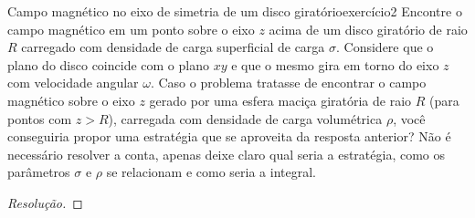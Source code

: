 \begin{exercício}{Campo magnético no eixo de simetria de um disco giratório}{exercício2}
    Encontre o campo magnético em um ponto sobre o eixo \(z\) acima de um disco giratório de raio \(R\) carregado com densidade de carga superficial de carga \(\sigma\). Considere que o plano do disco coincide com o plano \(xy\) e que o mesmo gira em torno do eixo \(z\) com velocidade angular \(\omega\). Caso o problema tratasse de encontrar o campo magnético sobre o eixo \(z\) gerado por uma esfera maciça giratória de raio \(R\) (para pontos com \(z > R\)), carregada com densidade de carga volumétrica \(\rho\), você conseguiria propor uma estratégia que se aproveita da resposta anterior? Não é necessário resolver a conta, apenas deixe claro qual seria a estratégia, como os parâmetros \(\sigma\) e \(\rho\) se relacionam e como seria a integral.
\end{exercício}
\begin{proof}[Resolução]

\end{proof}
